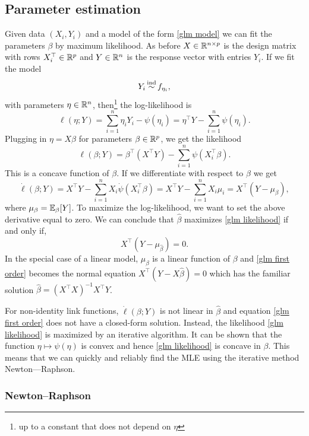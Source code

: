 \subsection{Parameter estimation}

Given data $(X_i,Y_i)$ and a model of the form \eqref{glm model} we can fit the parameters $\beta$ by maximum likelihood. As before $X \in \mathbb{R}^{n \times p}$ is the design matrix with rows $X_i^\top \in \mathbb{R}^p$ and $Y \in \mathbb{R}^n$ is the response vector with entries $Y_i$. If we fit the model
\[Y_i \simind f_{\eta_i}, \]
with parameters $\eta \in \mathbb{R}^n$, then\footnote{up to a constant that does not depend on $\eta$} the log-likelihood is
\[\ell(\eta;Y) = \sum_{i=1}^n \eta_iY_i - \psi(\eta_i) = \eta^\top Y - \sum_{i=1}^n \psi(\eta_i). \]
Plugging in $\eta = X\beta$ for parameters $\beta \in \mathbb{R}^p$, we get the likelihood
\begin{equation}\label{glm likelihood}\ell(\beta;Y) = \beta^\top(X^\top Y) - \sum_{i=1}^n \psi(X_i^\top \beta). \end{equation}
This is a concave function of $\beta$. If we differentiate with respect to $\beta$ we get 
\[\dot{\ell}(\beta;Y) = X^\top Y - \sum_{i=1}^n X_i\dot{\psi}(X_i^\top \beta) = X^\top Y - \sum_{i=1}^n X_i \mu_i = X^\top(Y-\mu_\beta), \]
where $\mu_\beta = {\mathbb E}_\beta[Y]$. To maximize the log-likelihood, we want to set the above derivative equal to zero. We can conclude that $\hat{\beta}$ maximizes \eqref{glm likelihood} if and only if,
\begin{equation}\label{glm first order}X^\top(Y-\mu_{\hat{\beta}}) = 0. \end{equation}
In the special case of a linear model, $\mu_\beta$ is a linear function of $\beta$ and \eqref{glm first order} becomes the normal equation $X^\top(Y-X\hat{\beta})=0$ which has the familiar solution $\hat{\beta} = (X^\top X)^{-1}X^\top Y$. 

For non-identity link functions, $\dot{\ell}(\beta;Y)$ is not linear in $\hat{\beta}$ and equation \eqref{glm first order} does not have a closed-form solution. Instead, the likelihood \eqref{glm likelihood} is maximized by an iterative algorithm. It can be shown that the function $\eta \mapsto \psi(\eta)$ is convex and hence \eqref{glm likelihood} is concave in $\beta$. This means that we can quickly and reliably find the MLE using the iterative method Newton---Raphson.

\subsubsection*{Newton--Raphson}



